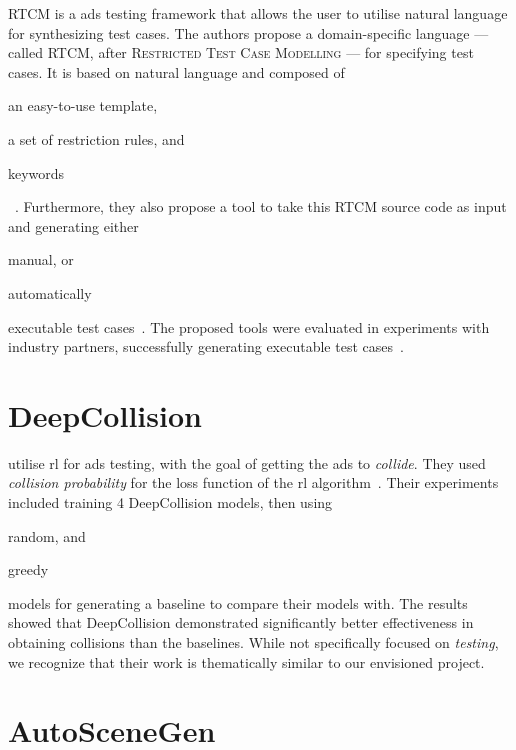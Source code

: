 RTCM is a \acrshort{ads} testing framework that allows the user to utilise natural language for
synthesizing test cases. The authors propose a domain-specific language --- called RTCM, after
\textsc{Restricted Test Case Modelling} --- for specifying test cases. It is based on natural language
and composed of \begin{inparaenum}
    \item an easy-to-use template,
    \item a set of restriction rules, and
    \item keywords \end{inparaenum}~\cite[397]{RTCM}.  Furthermore, they also propose a tool to
take this RTCM source code as input and generating either \begin{inparaenum}
    \item manual, or
    \item automatically \end{inparaenum} executable test cases~\cite[397]{RTCM}. The proposed tools
were evaluated in experiments with industry partners, successfully generating executable test
cases~\cite[397]{RTCM}.

\section{DeepCollision}

\citeauthor{deepCollision} utilise \acrfull{rl} for \acrshort{ads} testing, with the goal of getting
the \acrshort{ads} to \textit{collide}. They used \textit{collision probability} for the loss
function of the \acrlong{rl} algorithm~\cite[384]{deepCollision}. Their experiments included
training 4 DeepCollision models, then using \begin{inparaenum}
    \item random, and
    \item greedy
\end{inparaenum} models for generating a baseline to compare their models with. The results showed
that DeepCollision demonstrated significantly better effectiveness in obtaining collisions than the
baselines. While not specifically focused on \textit{testing}, we recognize that their work is thematically
similar to our envisioned project.

\section{AutoSceneGen}\label{sec:autoSceneGen}


